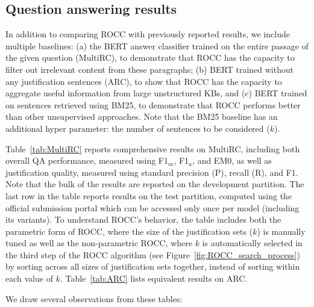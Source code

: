 \subsection{Question answering results}

In addition to comparing ROCC with previously reported results, we include multiple baselines: (a)  the BERT answer classifier trained on the entire passage of the given question (MultiRC), to demonstrate that ROCC has the capacity to filter out irrelevant content from these paragraphs; (b) BERT trained without any justification sentences (ARC), to show that ROCC has the capacity to aggregate useful information from large unstructured KBs, and (c) BERT trained on sentences retrieved using BM25, to demonstrate that ROCC performs better than other unsupervised approaches. Note that the BM25 baseline has an additional hyper parameter: the number of sentences to be considered ($k$). 

Table~\ref{tab:MultiRC} reports comprehensive results on MultiRC, including both overall QA performance, measured using F1$_m$, F1{$_a$}, and EM0, as well as justification quality, measured using standard precision (P), recall (R), and F1. Note that the bulk of the results are reported on the development partition. The last row in the table reports results on the test partition, computed using the official submission portal which can be accessed only once per model (including its variants). To understand ROCC's behavior, the table includes both the parametric form of ROCC, where the size of the justification sets ($k$) is manually tuned as well as the non-parametric ROCC, where $k$ is automatically selected in the third step of the ROCC algorithm (see Figure~\ref{fig:ROCC_search_process}) by sorting across all sizes of justification sets together, instead of sorting within each value of $k$. 
Table~\ref{tab:ARC} lists equivalent results on ARC.

We draw several observations from these tables:

